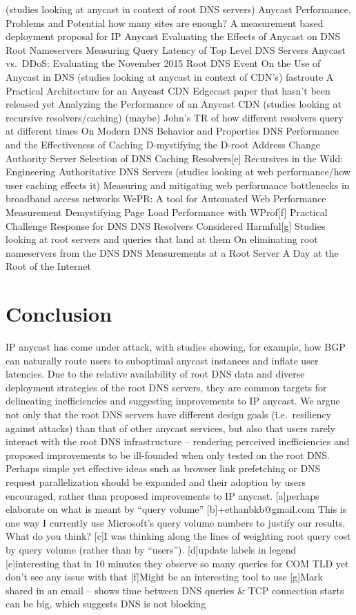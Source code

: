 \documentclass[sigconf,nonacm,10pt]{acmart}
\begin{document}
(studies looking at anycast in context of root DNS servers) Anycast
Performance, Problems and Potential how many sites are enough? A
measurement based deployment proposal for IP Anycast Evaluating the
Effects of Anycast on DNS Root Nameservers Measuring Query Latency of
Top Level DNS Servers Anycast vs.~DDoS: Evaluating the November 2015
Root DNS Event On the Use of Anycast in DNS (studies looking at anycast
in context of CDN's) fastroute A Practical Architecture for an Anycast
CDN Edgecast paper that hasn't been released yet Analyzing the
Performance of an Anycast CDN (studies looking at recursive
resolvers/caching) (maybe) John's TR of how different resolvers query at
different times On Modern DNS Behavior and Properties DNS Performance
and the Effectiveness of Caching D-mystifying the D-root Address Change
Authority Server Selection of DNS Caching Resolvers{[}e{]} Recursives in
the Wild: Engineering Authoritative DNS Servers (studies looking at web
performance/how user caching effects it) Measuring and mitigating web
performance bottlenecks in broadband access networks WePR: A tool for
Automated Web Performance Measurement Demystifying Page Load Performance
with WProf{[}f{]} Practical Challenge Response for DNS DNS Resolvers
Considered Harmful{[}g{]} Studies looking at root servers and queries
that land at them On eliminating root nameservers from the DNS DNS
Measurements at a Root Server A Day at the Root of the Internet

\fi

\section{Conclusion}\label{conclusion-1}

IP anycast has come under attack, with studies showing, for example, how
BGP can naturally route users to suboptimal anycast instances and
inflate user latencies. Due to the relative availability of root DNS
data and diverse deployment strategies of the root DNS servers, they are
common targets for delineating inefficiencies and suggesting
improvements to IP anycast. We argue not only that the root DNS servers
have different design goals (i.e.~resiliency against attacks) than that
of other anycast services, but also that users rarely interact with the
root DNS infrastructure -- rendering perceived inefficiencies and
proposed improvements to be ill-founded when only tested on the root
DNS. Perhaps simple yet effective ideas such as browser link prefetching
or DNS request parallelization should be expanded and their adoption by
users encouraged, rather than proposed improvements to IP anycast.
{[}a{]}perhaps elaborate on what is meant by ``query volume''
{[}b{]}+ethanbkb@gmail.com This is one way I currently use Microsoft's
query volume numbers to justify our results. What do you think? {[}c{]}I
was thinking along the lines of weighting root query cost by query
volume (rather than by ``users''). {[}d{]}update labels in legend
{[}e{]}interesting that in 10 minutes they observe so many queries for
COM TLD yet don't see any issue with that {[}f{]}Might be an interesting
tool to use {[}g{]}Mark shared in an email -- shows time between DNS
queries \& TCP connection starts can be big, which suggests DNS is not
blocking


\end{document}
